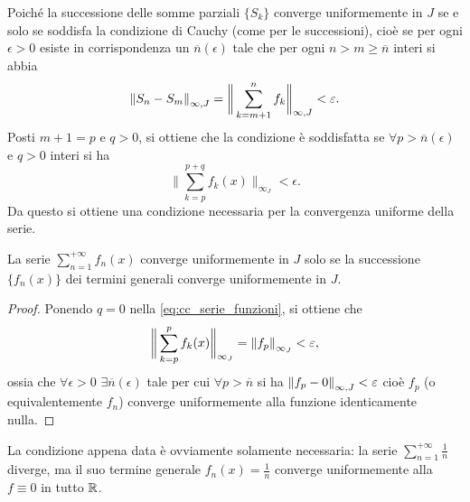 Poiché la successione delle somme parziali $\{S_k\}$ converge uniformemente in $J$ se e solo se soddisfa la condizione di Cauchy (come per le successioni), cioè se per ogni $\epsilon>0$ esiste in corrispondenza un $\overline{n}(\epsilon)$ tale che per ogni $n>m\geq\overline{n}$ interi si abbia
\[
\left\|{S_n-S_m}\right\|_{\infty,J}=\bigg\|\sum_{k=m+1}^nf_k\bigg\|_{\infty,J}<\varepsilon.
\]
Posti $m+1=p$ e $q>0$, si ottiene che la condizione è soddisfatta se $\forall p>\overline{n}(\epsilon)$ e $q>0$ interi si ha
\begin{equation} \label{eq:cc_serie_funzioni}
\bigg\|\sum_{k=p}^{p+q}f_k(x)\bigg\|_{\infty_J}<\epsilon.
\end{equation}
Da questo si ottiene una condizione necessaria per la convergenza uniforme della serie.
\begin{corollario}
La serie $\sum_{n=1}^{+\infty}f_n(x)$ converge uniformemente in $J$ solo se la successione $\{f_n(x)\}$ dei termini generali converge uniformemente in $J$.
\end{corollario}
\begin{proof}
Ponendo $q=0$ nella \eqref{eq:cc_serie_funzioni}, si ottiene che
\[
\bigg\|\sum_{k=p}^{p}f_k(x)\bigg\|_{\infty_J}=\left\|{f_p}\right\|_{\infty_J}<\varepsilon,
\]
ossia che $\forall\epsilon>0$ $\exists\overline{n}(\epsilon)$ tale per cui $\forall p>\overline{n}$ si ha $\left\|{f_p-0}\right\|_{\infty,J}<\varepsilon$ cioè $f_p$ (o equivalentemente $f_n$) converge uniformemente alla funzione identicamente nulla.
\end{proof}
La condizione appena data è ovviamente solamente necessaria: la serie $\sum_{n=1}^{+\infty}\frac1{n}$ diverge, ma il suo termine generale $f_n(x)=\frac1{n}$ converge uniformemente alla $f\equiv 0$ in tutto $\mathbb{R}$.

